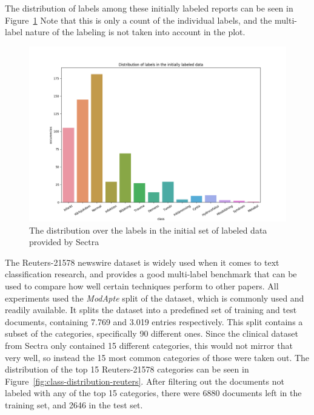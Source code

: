 The distribution of labels among these initially labeled reports can be seen in Figure~\ref{fig:class-distribution}
Note that this is only a count of the individual labels, and the multi-label nature of the labeling is not taken into account in the plot.

\begin{figure}
    \includegraphics[scale=0.5]{figures/class-distribution.png}
    \caption{The distribution over the labels in the initial set of labeled data provided by Sectra}
    \label{fig:class-distribution}
\end{figure}

The Reuters-21578 newswire dataset is widely used when it comes to text classification research, and provides a good multi-label benchmark that can be used to compare how well certain techniques perform to other papers.
All experiments used the \textit{ModApte} split of the dataset, which is commonly used and readily available. %
It splits the dataset into a predefined set of training and test documents, containing 7.769 and 3.019 entries respectively.
This split contains a subset of the categories, specifically 90 different ones.
Since the clinical dataset from Sectra only contained 15 different categories, this would not mirror that very well, so instead the 15 most common categories of those were taken out.
The distribution of the top 15 Reuters-21578 categories can be seen in Figure~\ref{fig:class-distribution-reuters}.
After filtering out the documents not labeled with any of the top 15 categories, there were 6880 documents left in the training set, and 2646 in the test set.


